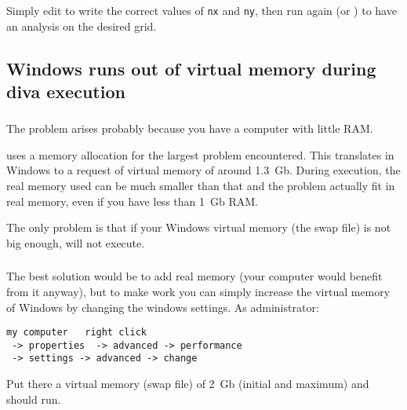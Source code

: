 \subsubsection{\answer}


Simply edit  to write the correct values of \texttt{nx} and \texttt{ny}, then run again  (or ) to have an analysis on the desired grid.


\subsection{Windows runs out of virtual memory during diva execution}


\subsubsection{\question}

The problem arises probably because you have a computer with little RAM.

\diva uses a memory allocation for the largest problem encountered. This 
translates in Windows to a request of virtual memory of around 1.3~Gb.
During execution, the real memory used can be much smaller than that and 
the problem actually fit in real memory, even if you have less than 1~Gb RAM.

The only problem is that if your Windows virtual memory (the swap file) 
is not big enough, \diva will not execute.


\subsubsection{\answer}

The best solution would be to 
add real memory (your computer would benefit from it anyway), but to 
make \diva work you can simply increase the virtual memory of Windows by 
changing the windows settings. As administrator:\\

\begin{verbatim}
my computer   right click
 -> properties  -> advanced -> performance
 -> settings -> advanced -> change
\end{verbatim}

Put there a virtual memory (swap file) of 2~Gb (initial and maximum) and 
\diva should run. 

